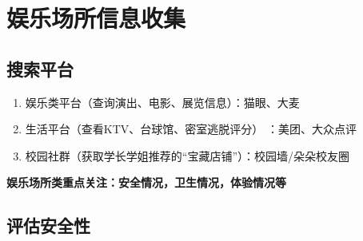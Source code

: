 \documentclass{amznotes}
\begin{document}
\section{娱乐场所信息收集}
\subsection{搜索平台}
\begin{enumerate}
  \item 娱乐类平台（查询演出、电影、展览信息）：猫眼、大麦
  \item 生活平台（查看KTV、台球馆、密室逃脱评分） ：美团、大众点评
  \item 校园社群（获取学长学姐推荐的“宝藏店铺”）：校园墙/朵朵校友圈
\end{enumerate}
\textbf{娱乐场所类重点关注：安全情况，卫生情况，体验情况等}
\subsection{评估安全性}
\end{document}

